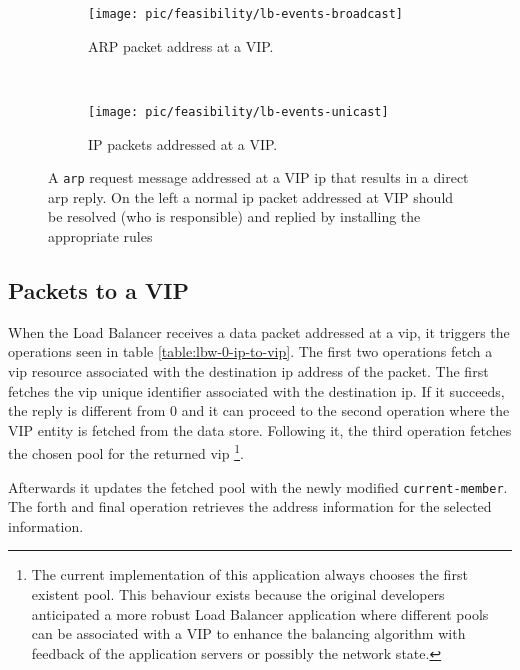 \begin{figure}
  \centering
  \begin{subfigure}[b]{0.5\textwidth}
                \centering
                \texttt{[image: pic/feasibility/lb-events-broadcast]}
                \caption{ARP packet address at a VIP.}
                \label{fig:lb:interaction:arp2Vip}
        \end{subfigure}%
        ~
        \begin{subfigure}[b]{0.5\textwidth}
                \centering
                \texttt{[image: pic/feasibility/lb-events-unicast]}
                \caption{IP packets addressed at a VIP. }
                \label{fig:lb:interaction:ip2Vip}
        \end{subfigure}
        \caption[Load Balancer workload events]{A \texttt{\gls{arp}} request message addressed at a VIP \gls{ip} that results in a direct \gls{arp} reply. On the left a normal \gls{ip} packet addressed at VIP should be resolved (who is responsible) and replied by installing the appropriate rules}  
        \label{fig:lb:interaction}
\end{figure}

\subsection{Packets to a VIP}
When the Load Balancer receives a data packet addressed
at a \gls{vip}, it triggers the operations seen in table \ref{table:lbw-0-ip-to-vip}. 
The first two operations fetch a \gls{vip} resource associated with the
destination \gls{ip} address of the packet. The first fetches the
\gls{vip} unique identifier associated with the destination
\gls{ip}. If it succeeds, the reply is different from 0 and it can
proceed to the second operation where the \gls{VIP} entity is fetched
from the data store. 
Following it, the third operation fetches the chosen pool for the returned  \gls{vip} \footnote{The current implementation of this
application always chooses the first existent pool. This behaviour
exists because the original developers anticipated a more robust Load Balancer application
where different pools can be associated with a \gls{VIP} to enhance
the balancing algorithm with feedback of the application servers or
possibly the network state.}.

Afterwards it updates the fetched  pool with the newly modified
\texttt{current-member}. The forth and final operation retrieves
the address information for the selected information. 

